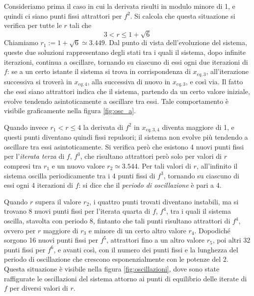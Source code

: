 Consideriamo prima il caso in cui la derivata risulti in modulo minore di 1, e quindi ci siano punti fissi attrattori per $f^2$. Si calcola che questa situazione si verifica per tutte le $r$ tali che $$ 3 < r \leq 1 +\sqrt{6}$$
Chiamiamo $r_1 := 1 +\sqrt{6} \simeq 3.449$. Dal punto di vista dell'evoluzione del sistema, queste due soluzioni rappresentano degli stati tra i quali il sistema, dopo infinite iterazioni, continua a oscillare, tornando su ciascuno di essi ogni due iterazioni di $f$: se a un certo istante il sistema si trova in corrispondenza di $x_{eq,3}$, all'iterazione successiva si troverà in $x_{eq,4}$, alla successiva di nuovo in $x_{eq,3}$, e così via. Il fatto che essi siano attrattori indica che il sistema, partendo da un certo valore iniziale, evolve tendendo asintoticamente a oscillare tra essi. Tale comportamento è visibile graficamente nella figura \ref{fig:osc_a}.


Quando invece $r_1 < r \leq 4$ la derivata di $f^2$ in $x_{eq,3,4}$ diventa maggiore di 1, e questi punti diventano quindi fissi repulsori; il sistema non evolve più tendendo a oscillare tra essi asintoticamente. Si verifica però che esistono 4 nuovi punti fissi per l'\textit{iterata terza} di $f$, $f^3$, che risultano attrattori però solo per valori di $r$ compresi tra $r_1$ e un nuovo valore $r_2 \simeq 3.544$. Per tali valori di $r$, all'infinito il sistema oscilla periodicamente tra i 4 punti fissi di $f^3$, tornando su ciascuno di essi ogni 4 iterazioni di $f$: si dice che il \textit{periodo di oscillazione} è pari a 4.

Quando $r$ supera il valore $r_2$, i quattro punti trovati diventano instabili, ma si trovano 8 nuovi punti fissi per l'iterata quarta di $f$, $f^4$, tra i quali il sistema oscilla, stavolta con periodo 8, fintanto che tali punti risultano attrattori di $f^4$, ovvero per $r$ maggiore di $r_3$ e minore di un certo altro valore $r_4$. Dopodiché sorgono 16 nuovi punti fissi per $f^5$, attrattori fino a un altro valore $r_5$, poi altri 32 punti fissi per $f^6$, e avanti così, con il numero dei punti fissi e la lunghezza del periodo di oscillazione che crescono esponenzialmente con le potenze del 2. Questa situazione è visibile nella figura \ref{fig:oscillazioni}, dove sono state raffigurate le oscillazioni del sistema attorno ai punti di equilibrio delle iterate di $f$ per diversi valori di $r$.


